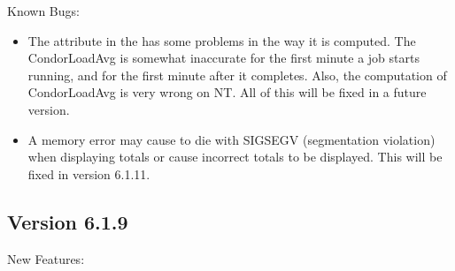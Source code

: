 \noindent Known Bugs:

\begin{itemize}

\item The  attribute in the  has
some problems in the way it is computed.
The CondorLoadAvg is somewhat inaccurate for the first minute a job
starts running, and for the first minute after it completes.
Also, the computation of CondorLoadAvg is very wrong on NT.
All of this will be fixed in a future version.

\item A memory error may cause  to die with SIGSEGV
(segmentation violation) when displaying totals or cause incorrect
totals to be displayed.  This will be fixed in version 6.1.11.

\end{itemize}


\subsection{\label{sec:New-6-1-9}Version 6.1.9}

\noindent New Features:

